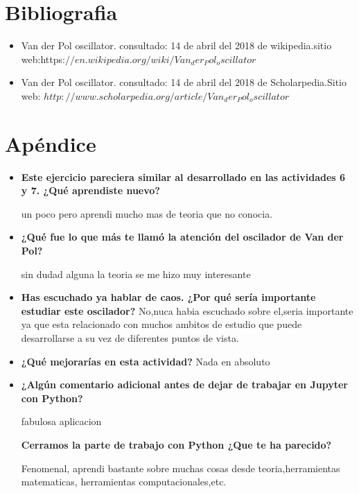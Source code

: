 \documentclass{article}
\begin{document}
\section{Bibliografia}

\begin{itemize}
\item Van der Pol oscillator. consultado: 14 de abril del 2018 de wikipedia.sitio web:https:$//en.wikipedia.org/wiki/Van_der_Pol_oscillator$ 

\item Van der Pol oscillator. consultado: 14 de abril del 2018 de Scholarpedia.Sitio web: $http://www.scholarpedia.org/article/Van_der_Pol_oscillator$ 
\end{itemize}



\section{Apéndice}
\begin{itemize}
\item \textbf{Este ejercicio pareciera similar al desarrollado en las actividades 6 y 7. ¿Qué aprendiste nuevo?}

un poco pero aprendi mucho mas de teoria que no conocia.


\item \textbf{¿Qué fue lo que más te llamó la atención del oscilador de Van der Pol?}

sin dudad alguna la teoria se me hizo muy interesante


 \item  \textbf{ Has escuchado ya hablar de caos. ¿Por qué sería importante estudiar este oscilador?}
No,nuca habia escuchado sobre el,seria importante ya que esta relacionado con muchos ambitos de estudio que puede desarrollarse a su vez de diferentes puntos de vista.
 
 \item   \textbf{¿Qué mejorarías en esta actividad?}
 Nada en absoluto
 
  \item \textbf{ ¿Algún comentario adicional antes de dejar de trabajar en Jupyter con Python?}
  
  fabulosa aplicacion
  
   \textbf{ Cerramos la parte de trabajo con Python ¿Que te ha parecido?}

Fenomenal, aprendi bastante sobre muchas cosas desde teoria,herramientas matematicas, herramientas computacionales,etc.
\end{itemize}
\end{document}
